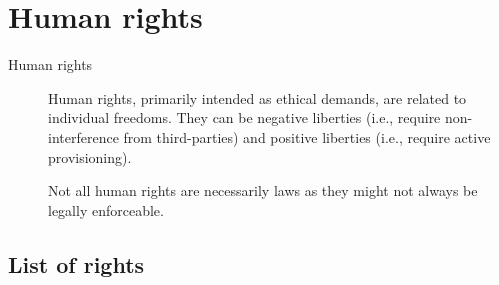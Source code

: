 \chapter{Human rights}


\begin{description}
    \item[Human rights] 
        Human rights, primarily intended as ethical demands, are related to individual freedoms. They can be negative liberties (i.e., require non-interference from third-parties) and positive liberties (i.e., require active provisioning).

        \begin{remark}
            Not all human rights are necessarily laws as they might not always be legally enforceable. 
        \end{remark}
\end{description}


\section{List of rights}


